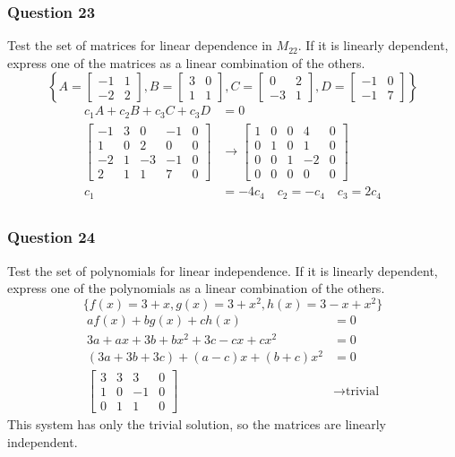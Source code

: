 \documentclass{math}
\begin{document}
\subsubsection*{Question 23}
Test the set of matrices for linear dependence in \( M_{22} \). If it is
linearly dependent, express one of the matrices as a linear combination of the
others.
\[ \left\{A = \begin{bmatrix}-1 & 1 \\ -2 & 2\end{bmatrix},
  B = \begin{bmatrix}3 & 0 \\ 1 & 1\end{bmatrix},
  C = \begin{bmatrix}0 & 2 \\ -3 & 1\end{bmatrix},
  D = \begin{bmatrix}-1 & 0 \\ -1 & 7\end{bmatrix}\right\} \]
\begin{align*}
  c_1A+c_2B+c_3C+c_3D &= 0 \\
  \left[\begin{array}{cccc|c}
    -1 & 3 & 0 & -1 & 0 \\
    1 & 0 & 2 & 0 & 0 \\
    -2 & 1 & -3 & -1 & 0 \\
    2 & 1 & 1 & 7 & 0
  \end{array}\right] &\to \left[\begin{array}{cccc|c}
    1 & 0 & 0 & 4 & 0 \\
    0 & 1 & 0 & 1 & 0 \\
    0 & 0 & 1 & -2 & 0 \\
    0 & 0 & 0 & 0 & 0
  \end{array}\right] \\
  c_1 &= -4c_4 \quad c_2 = -c_4 \quad c_3 = 2c_4 \\
\end{align*}

\subsubsection*{Question 24}
Test the set of polynomials for linear independence. If it is linearly
dependent, express one of the polynomials as a linear combination of the others.
\[ \{f(x) = 3+x, g(x) = 3+x^2, h(x) = 3-x+x^2\} \]
\begin{align*}
  af(x)+bg(x)+ch(x) &= 0 \\
  3a+ax+3b+bx^2+3c-cx+cx^2 &= 0 \\
  (3a+3b+3c)+(a-c)x+(b+c)x^2 &= 0 \\
  \left[\begin{array}{ccc|c}
    3 & 3 & 3 & 0 \\
    1 & 0 & -1 & 0 \\
    0 & 1 & 1 & 0
  \end{array}\right] &\to \text{trivial}
\end{align*}
This system has only the trivial solution, so the matrices are linearly
independent.
\end{document}
